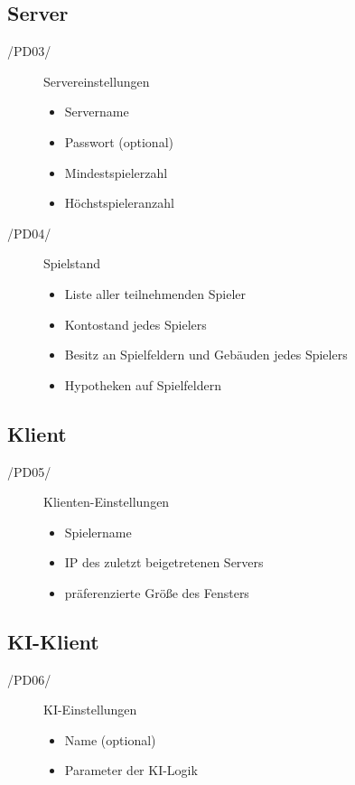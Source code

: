 \documentclass[a4paper,10pt]{article}
\begin{document}
\subsection{Server}
\begin{description}
\item[/PD03/] Servereinstellungen
\begin{itemize}
\item Servername
\item Passwort (optional)
\item Mindestspielerzahl
\item Höchstspieleranzahl
\end{itemize}
\item[/PD04/] Spielstand
\begin{itemize}
\item Liste aller teilnehmenden Spieler
\item Kontostand jedes Spielers
\item Besitz an Spielfeldern und Gebäuden jedes Spielers
\item Hypotheken auf Spielfeldern
\end{itemize}
\end{description}

\subsection{Klient}
\begin{description}
\item[/PD05/] Klienten-Einstellungen
\begin{itemize}
\item Spielername
\item IP des zuletzt beigetretenen Servers
\item präferenzierte Größe des Fensters
\end{itemize}
\end{description}

\subsection{KI-Klient}
\begin{description}
\item[/PD06/] KI-Einstellungen
\begin{itemize}
\item Name (optional)
\item Parameter der KI-Logik
\end{itemize}
\end{description}
\end{document}
